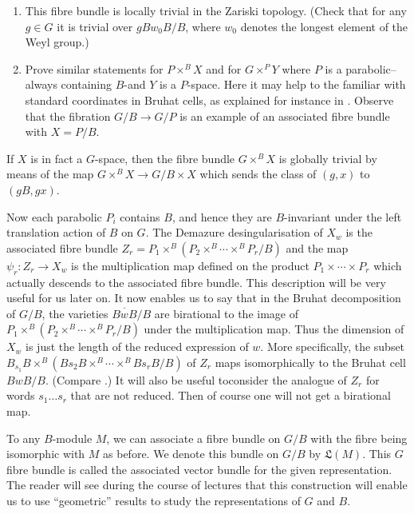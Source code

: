 \label{page7}
\begin{exercise}\label{chap1-exer1.2.1}
\begin{enumerate}
\renewcommand{\theenumi}{\roman{enumi}}
\renewcommand{\labelenumi}{(\theenumi)}
\item This fibre bundle is locally trivial in the Zariski
  topology. (Check that for any $g\in G$ it is trivial over
  $gBw_{0}B/B$, where $w_{0}$ denotes the longest element of the Weyl
  group.)

\item Prove similar statements for $P\times^{B}X$ and for
  $G\times^{P}Y$ where $P$ is a parabolic--always containing $B$-and
  $Y$ is a $P$-space. Here it may help to the familiar with standard
  coordinates in Bruhat cells, as explained for instance in
  \cite[Chapter 10]{key34}. Observe that the fibration $G/B\to G/P$ is
  an example of an associated fibre bundle with $X=P/B$.
\end{enumerate}
\end{exercise}

\begin{remark}\label{chap1-rem1.2.2}
If $X$ is in fact a $G$-space, then the fibre bundle $G\times^{B}X$ is
globally trivial by means of the map $G\times^{B}X\to G/B\times X$
which sends the class of $(g,x)$ to $(gB,gx)$.
\end{remark}

Now each parabolic $P_{i}$ contains $B$, and hence they are
$B$-invariant under the left translation action of $B$ on $G$. The
Demazure desingularisation of $X_{w}$ is the associated fibre bundle
$Z_{r}=P_{1}\times^{B}(P_{2}\times^{B}\cdots \times^{B}P_{r}/B)$ and
the map $\psi_{r}:Z_{r}\to X_{w}$ is the multiplication map defined on
the product $P_{1}\times\cdots\times P_{r}$ which actually descends to
the associated fibre bundle. This description will be very useful for
us later on. It now enables us to say that in the Bruhat decomposition
of $G/B$, the varieties $\overline{BwB}/B$ are birational to the image
of $P_{1}\times^{B}(P_{2}\times^{B}\cdots\times^{B}P_{r}/B)$ under the
multiplication map. Thus the dimension of $X_{w}$ is just the length
of the reduced expression of $w$. More specifically, the subset
$B_{s_{1}}B\times^{B}(Bs_{2}B\times^{B}\cdots \times^{B}Bs_{r}B/B)$ of
$Z_{r}$ maps isomorphically to the Bruhat cell $BwB/B$. (Compare
\cite[Chapter 10]{key34}.) It will also be useful
to\pageoriginale consider the analogue of $Z_{r}$ for words
$s_{1}\ldots s_{r}$ that are not reduced. Then of course one will not
get a birational map.

\label{page8}
To any $B$-module $M$, we can associate a fibre bundle on $G/B$ with
the fibre being isomorphic with $M$ as before. We denote this bundle
on $G/B$ by $\mathfrak{L}(M)$. This $G$ fibre bundle is called the
associated vector bundle 
for the given representation. The reader will
see during the course of lectures that this construction will enable
us to use ``geometric'' results to study the representations of $G$
and $B$.







